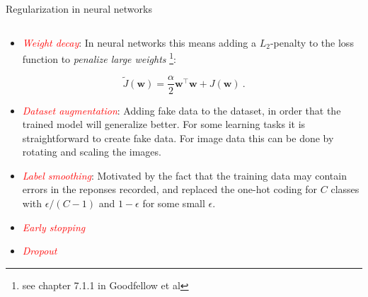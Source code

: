 \documentclass[10pt,ignorenonframetext,]{beamer}
\providecommand{\tightlist}{%
  \setlength{\itemsep}{0pt}\setlength{\parskip}{0pt}}
\begin{document}
\begin{frame}

\begin{block}{Regularization in neural networks}

\(~\)

\begin{itemize}
\tightlist
\item
  \emph{\textcolor{red}{Weight decay}}: In neural networks this means
  adding a \(L_2\)-penalty to the loss function to \emph{penalize large
  weights} \footnote{see chapter 7.1.1 in Goodfellow et al}:
\end{itemize}

\[ \tilde{J}({\boldsymbol w})= \frac{\alpha}{2}{{\boldsymbol w}^\top{\boldsymbol w}} + J({\boldsymbol w}) \ .\]

\vspace{2mm}

\begin{itemize}
\tightlist
\item
  \emph{\textcolor{red}{Dataset augmentation}}: Adding fake data to the
  dataset, in order that the trained model will generalize better. For
  some learning tasks it is straightforward to create fake data. For
  image data this can be done by rotating and scaling the images.
\end{itemize}

\vspace{2mm}

\begin{itemize}
\tightlist
\item
  \emph{\textcolor{red}{Label smoothing}}: Motivated by the fact that
  the training data may contain errors in the reponses recorded, and
  replaced the one-hot coding for \(C\) classes with \(\epsilon/(C-1)\)
  and \(1-\epsilon\) for some small \(\epsilon\).
\end{itemize}

\vspace{2mm}

\begin{itemize}
\tightlist
\item
  \emph{\textcolor{red}{Early stopping}}
\end{itemize}

\vspace{2mm}

\begin{itemize}
\tightlist
\item
  \emph{\textcolor{red}{Dropout}}
\end{itemize}

\end{block}

\end{frame}
\end{document}

